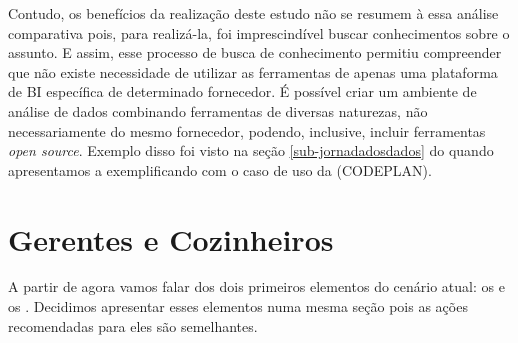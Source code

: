     Contudo, os benefícios da realização deste estudo não se resumem à essa análise comparativa pois, para realizá-la, foi imprescindível buscar conhecimentos sobre o assunto. E assim, esse processo de busca de conhecimento permitiu compreender que não existe necessidade de utilizar as ferramentas de apenas uma plataforma de BI específica de determinado fornecedor. É possível criar um ambiente de análise de dados combinando ferramentas de diversas naturezas, não necessariamente do mesmo fornecedor, podendo, inclusive, incluir ferramentas \emph{open source}. Exemplo disso foi visto na seção \ref{sub-jornadadosdados} do  quando apresentamos a  exemplificando com o caso de uso da \CODEPLAN \xspace (CODEPLAN). 

    
    
    
    

    \section{Gerentes e Cozinheiros}
    
    A partir de agora vamos falar dos dois primeiros elementos \mschecknao \xspace do cenário atual: os \COZINHEIROS \xspace e os \GERENTES. Decidimos apresentar esses elementos numa mesma seção pois as ações recomendadas para eles são semelhantes. 
    
